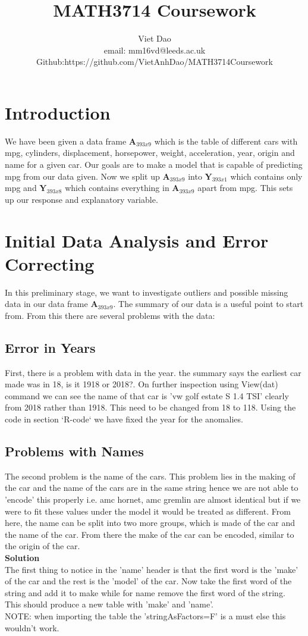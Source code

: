 \documentclass[11pt]{article} %
\title{MATH3714 Coursework}
\author{Viet Dao\\email: mm16vd@leeds.ac.uk\\Github:https://github.com/VietAnhDao/MATH3714Coursework}
\begin{document}
\maketitle
\newpage
\tableofcontents
\newpage

\section{Introduction}
We have been given a data frame $\textbf{A}_{393x9}$ which is the table of different cars with mpg, cylinders, displacement, horsepower, weight, acceleration, year, origin and name for a given car. Our goals are to make a model that is capable of predicting mpg from our data given. Now we split up $\textbf{A}_{393x9}$ into $\textbf{Y}_{393x1}$ which contains only mpg and $\textbf{Y}_{393x8}$ which contains everything in $\textbf{A}_{393x9}$ apart from mpg. This sets up our response and explanatory variable.

\section{Initial Data Analysis and Error Correcting}
In this preliminary stage, we want to investigate outliers and possible missing data in our data frame $\textbf{A}_{393x9}$. The summary of our data is a useful point to start from. From this there are several problems with the data:
\subsection{Error in Years}
First, there is a problem with data in the year. the summary says the earliest car made was in 18, is it 1918 or 2018?. On further inspection using View(dat) command we can see the name of that car is 'vw golf estate S 1.4 TSI' clearly from 2018 rather than 1918. This need to be changed from 18 to 118. Using the code in section `R-code` we have fixed the year for the anomalies.

\subsection{Problems with Names}
The second problem is the name of the cars. This problem lies in the making of the car and the name of the cars are in the same string hence we are not able to 'encode' this properly i.e. amc hornet, amc gremlin are almost identical but if we were to fit these values under the model it would be treated as different. From here, the name can be split into two more groups, which is made of the car and the name of the car. From there the make of the car can be encoded, similar to the origin of the car.\\
\textbf{Solution}\\
The first thing to notice in the 'name' header is that the first word is the 'make' of the car and the rest is the 'model' of the car. Now take the first word of the string and add it to make while for name remove the first word of the string.\\
This should produce a new table with 'make' and 'name'.\\
NOTE: when importing the table the 'stringAsFactors=F' is a must else this wouldn't work.
\end{document}
